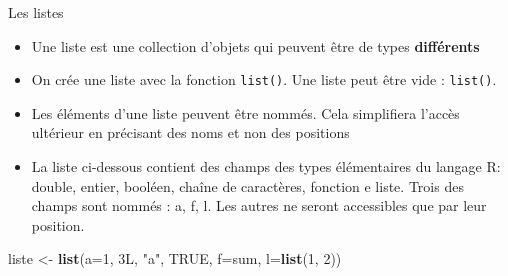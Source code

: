 \documentclass[
  ignorenonframetext,
]{beamer}
\newenvironment{Shaded}{\begin{snugshade}}{\end{snugshade}}
\newcommand{\AttributeTok}[1]{\textcolor[rgb]{0.13,0.29,0.53}{#1}}
\newcommand{\ConstantTok}[1]{\textcolor[rgb]{0.56,0.35,0.01}{#1}}
\newcommand{\DataTypeTok}[1]{\textcolor[rgb]{0.13,0.29,0.53}{#1}}
\newcommand{\DecValTok}[1]{\textcolor[rgb]{0.00,0.00,0.81}{#1}}
\newcommand{\FunctionTok}[1]{\textcolor[rgb]{0.13,0.29,0.53}{\textbf{#1}}}
\newcommand{\NormalTok}[1]{#1}
\newcommand{\OtherTok}[1]{\textcolor[rgb]{0.56,0.35,0.01}{#1}}
\newcommand{\StringTok}[1]{\textcolor[rgb]{0.31,0.60,0.02}{#1}}
\providecommand{\tightlist}{%
  \setlength{\itemsep}{0pt}\setlength{\parskip}{0pt}}
\begin{document}
\begin{frame}[fragile]{Les listes}
\protect\hypertarget{les-listes}{}
\begin{itemize}
\tightlist
\item
  Une liste est une collection d'objets qui peuvent être de types
  \textbf{différents}
\item
  On crée une liste avec la fonction \texttt{list()}. Une liste peut
  être vide : \texttt{list()}.
\item
  Les éléments d'une liste peuvent être nommés. Cela simplifiera l'accès
  ultérieur en précisant des noms et non des positions
\item
  La liste ci-dessous contient des champs des types élémentaires du
  langage R: double, entier, booléen, chaîne de caractères, fonction e
  liste. Trois des champs sont nommés : a, f, l. Les autres ne seront
  accessibles que par leur position.
\end{itemize}

\tiny

\begin{Shaded}
\begin{Highlighting}[]
\NormalTok{liste }\OtherTok{\textless{}{-}} \FunctionTok{list}\NormalTok{(}\AttributeTok{a=}\DecValTok{1}\NormalTok{, }\DecValTok{3}\DataTypeTok{L}\NormalTok{, }\StringTok{"a"}\NormalTok{, }\ConstantTok{TRUE}\NormalTok{, }\AttributeTok{f=}\NormalTok{sum, }\AttributeTok{l=}\FunctionTok{list}\NormalTok{(}\DecValTok{1}\NormalTok{, }\DecValTok{2}\NormalTok{))}
\end{Highlighting}
\end{Shaded}

\normalsize
\end{frame}
\end{document}
